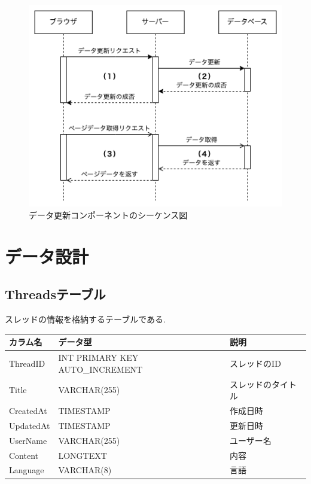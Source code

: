 \documentclass[b5paper,12pt,dvipdfmx]{jsreport}
\begin{document}

\begin{figure}[H]
    \centering
    \includegraphics[width=\textwidth]{./img/components/data_update_component_sequence_diagram.png}
    \caption{データ更新コンポーネントのシーケンス図}
    \label{data_update_component_sequence_diagram}
\end{figure}


\section{データ設計}

\subsection*{Threadsテーブル}

スレッドの情報を格納するテーブルである.

\begin{adjustbox}{width=\textwidth,center}
	\begin{tabular}{lll}
	\toprule
	\textbf{カラム名} & \textbf{データ型} & \textbf{説明} \\
	\midrule
	ThreadID   & INT PRIMARY KEY AUTO\_INCREMENT & スレッドのID \\
	Title      & VARCHAR(255) & スレッドのタイトル \\
	CreatedAt  & TIMESTAMP & 作成日時 \\
	UpdatedAt  & TIMESTAMP & 更新日時 \\
	UserName   & VARCHAR(255) & ユーザー名 \\
	Content    & LONGTEXT & 内容 \\
	Language   & VARCHAR(8) & 言語 \\
	\bottomrule
	\end{tabular}
\end{adjustbox}
\end{document}
